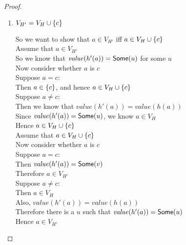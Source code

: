\begin{proof}
\begin{enumerate}
\item $V_{H'} = V_H \cup \{{c}\}$ 
  \begin{tabbedproof}
    \oo So we want to show that $a \in V_{H'}$ iff $a \in V_H \cup \{{c}\}$ \\
    \oo Assume that $a \in V_{H'}$ \\
    \ooo So we know that $\mathit{value}(h'(a)) = \mathsf{Some}(u)$ for some $u$ \\
    \ooo Now consider whether $a$ is $c$ \\
    \ooo Suppose $a = c$: \\
    \oooo Then $a \in \{{c}\}$, and hence $a \in V_H \cup \{{c}\}$ \\
    \ooo Suppose $a \not= c$: \\
    \oooo Then we know that $\mathit{value}(h'(a)) = \mathit{value}(h(a))$ \\
    \oooo Since $\mathit{value}(h'(a)) = \mathsf{Some}(u)$, we know $a \in V_H$ \\
    \oooo Hence $a \in V_H \cup \{{c}\}$ \\
    \oo Assume that $a \in V_H \cup \{{c}\}$ \\
    \ooo Now consider whether $a$ is $c$ \\
    \ooo Suppose $a = c$: \\
    \oooo Then $\mathit{value}(h'(a)) = \mathsf{Some}(v)$ \\
    \oooo Therefore $a \in V_{H'}$ \\
    \ooo Suppose $a \not= c$: \\
    \oooo Then $a \in V_H$ \\
    \oooo Also, $\mathit{value}(h'(a)) = \mathit{value}(h(a))$ \\
    \oooo Therefore there is a $u$ such that $\mathit{value}(h'(a)) = \mathsf{Some}(u)$ \\
    \oooo Hence $a \in V_{H'}$ \\
  \end{tabbedproof}


\end{enumerate}
\end{proof}
